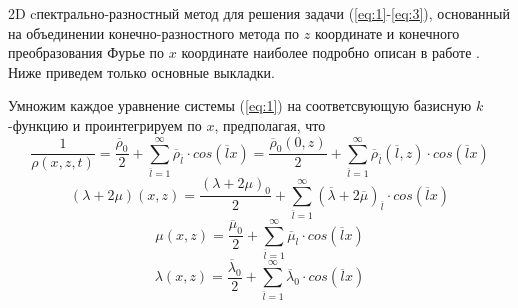 2D cпектрально-разностный метод для решения задачи (\ref{eq:1}-\ref{eq:3}), основанный на объединении
конечно-разностного метода по $z$ координате и конечного преобразования Фурье по $x$ координате
наиболее подробно описан в работе \cite{mart}. Ниже приведем только основные выкладки.

Умножим каждое уравнение системы (\ref{eq:1}) на соответсвующую базисную $k$-функцию и проинтегрируем
по $x$, предполагая, что
$$
\frac{1}{\rho(x,z,t)} = \frac{\overline{\rho}_0}{2} + \sum_{\overline l=1}^\infty{\overline{\rho}_{\overline l} \cdot cos(\overline lx)}
	= \frac{\overline{\rho}_0(0,z)}{2} + \sum_{\overline l=1}^\infty{\overline{\rho}_{\overline l}(\overline l,z) \cdot cos(\overline lx)}
$$
$$
(\lambda + 2 \mu)(x,z) = \frac{(\lambda + 2 \mu)_0}{2} + \sum_{\overline l=1}^\infty{(\overline{\lambda} + 2 \overline{\mu})_{\overline l} \cdot cos(\overline lx)}
$$
$$
\mu(x,z) = \frac{\overline{\mu}_0}{2} + \sum_{\overline l=1}^\infty{\overline{\mu}_l \cdot cos(\overline lx)}
$$
$$
\lambda(x,z) = \frac{\overline{\lambda}_0}{2} + \sum_{\overline l=1}^\infty{\overline{\lambda}_0 \cdot cos(\overline lx)}
$$

